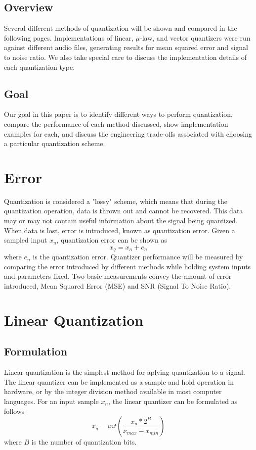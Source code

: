\documentclass[journal]{IEEEtran}
\begin{document}
\subsection{Overview}
Several different methods of quantization will be shown and compared in the following pages. Implementations of linear, 
$\mu$-law, and vector quantizers were run against different audio files, generating results for mean squared error and 
signal to noise ratio. We also take special care to discuss the implementation details of each quantization type.

\subsection{Goal}
Our goal in this paper is to identify different ways to perform quantization, compare the performance of each method discussed, show 
implementation examples for each, and discuss the engineering trade-offs associated with choosing a particular quantization scheme.

\section{Error}
Quantization is considered a "lossy" scheme, which means that during the quantization operation, data is thrown out and cannot
be recovered. This data may or may not contain useful information about the signal being quantized. When data is lost, error is
introduced, known as quantization error. Given a sampled input $x_n$, quantization error can be shown as \cite{DSPBook}
\begin{equation}
    x_q = x_n + e_n
\end{equation}
where $e_n$ is the quantization error. Quantizer performance will be measured by comparing the error introduced by different methods
while holding system inputs and parameters fixed. Two basic measurements convey the amount of error introduced, Mean Squared Error (MSE)
and SNR (Signal To Noise Ratio).

\section{Linear Quantization}
\subsection{Formulation}
Linear quantization is the simplest method for aplying quantization to a signal. The linear quantizer can be implemented as a sample
and hold operation in hardware, or by the integer division method available in most computer languages. For an input sample $x_n$, the
linear quantizer can be formulated as follows \cite{DSPBook}
\begin{equation}
    x_q = int(\frac{x_n*2^B}{x_{max} - x_{min}}) 
    \label{eq:linear}
\end{equation}
where $B$ is the number of quantization bits.
\end{document}
